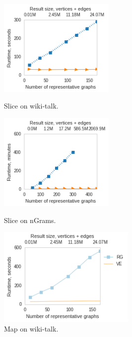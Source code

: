 \begin{figure}
\centering
\begin{minipage}{2.2in}
\centering
\includegraphics[width=2.2in]{figs/slice_wikitalk_build13.png}
\vspace{-0.1in}
\caption{Slice on wiki-talk.}
\label{fig:slicewiki}
\vspace{-0.1in}
\end{minipage}
\begin{minipage}{2.2in}
\centering
\includegraphics[width=2.2in]{figs/slice_ngrams_build13.png}
\vspace{-0.1in}
\caption{Slice on nGrams.}
\label{fig:slicengrams}
\vspace{-0.1in}
\end{minipage}
\begin{minipage}{2.2in}
\centering
\includegraphics[width=2.6in]{figs/project_wikitalk_build13.png}
\vspace{-0.1in}
\caption{Map on wiki-talk.}
\label{fig:project}
\vspace{-0.1in}
\end{minipage}
\end{figure}

